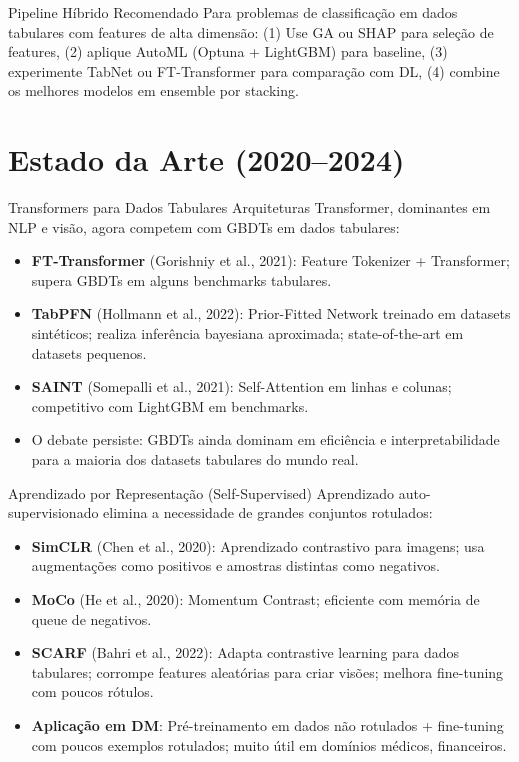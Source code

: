 \documentclass[12pt,a4paper]{article}
\begin{document}
\begin{dicabox}{Pipeline Híbrido Recomendado}
Para problemas de classificação em dados tabulares com features de alta dimensão: (1) Use GA ou SHAP para seleção de features, (2) aplique AutoML (Optuna + LightGBM) para baseline, (3) experimente TabNet ou FT-Transformer para comparação com DL, (4) combine os melhores modelos em ensemble por stacking.
\end{dicabox}

\section{Estado da Arte (2020--2024)}

\begin{estadoartebox}{Transformers para Dados Tabulares}
Arquiteturas Transformer, dominantes em NLP e visão, agora competem com GBDTs em dados tabulares:
\begin{itemize}
  \item \textbf{FT-Transformer} (Gorishniy et al., 2021): Feature Tokenizer + Transformer; supera GBDTs em alguns benchmarks tabulares.
  \item \textbf{TabPFN} (Hollmann et al., 2022): Prior-Fitted Network treinado em datasets sintéticos; realiza inferência bayesiana aproximada; state-of-the-art em datasets pequenos.
  \item \textbf{SAINT} (Somepalli et al., 2021): Self-Attention em linhas e colunas; competitivo com LightGBM em benchmarks.
  \item O debate persiste: GBDTs ainda dominam em eficiência e interpretabilidade para a maioria dos datasets tabulares do mundo real.
\end{itemize}
\end{estadoartebox}

\begin{estadoartebox}{Aprendizado por Representação (Self-Supervised)}
Aprendizado auto-supervisionado elimina a necessidade de grandes conjuntos rotulados:
\begin{itemize}
  \item \textbf{SimCLR} (Chen et al., 2020): Aprendizado contrastivo para imagens; usa augmentações como positivos e amostras distintas como negativos.
  \item \textbf{MoCo} (He et al., 2020): Momentum Contrast; eficiente com memória de queue de negativos.
  \item \textbf{SCARF} (Bahri et al., 2022): Adapta contrastive learning para dados tabulares; corrompe features aleatórias para criar visões; melhora fine-tuning com poucos rótulos.
  \item \textbf{Aplicação em DM}: Pré-treinamento em dados não rotulados + fine-tuning com poucos exemplos rotulados; muito útil em domínios médicos, financeiros.
\end{itemize}
\end{estadoartebox}
\end{document}
